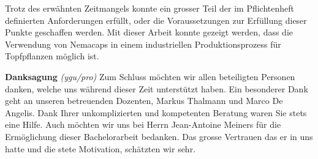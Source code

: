 Trotz des erwähnten Zeitmangels konnte ein grosser Teil der im Pflichtenheft definierten Anforderungen erfüllt, oder die Voraussetzungen zur Erfüllung dieser Punkte geschaffen werden. Mit dieser Arbeit konnte gezeigt werden, dass die Verwendung von Nemacaps in einem industriellen Produktionsprozess für Topfpflanzen möglich ist.
\newline

\textbf{Danksagung}
\newline
\textit{(ygu/pro)} Zum Schluss möchten wir allen beteiligten Personen danken, welche uns während dieser Zeit unterstützt haben. Ein besonderer Dank geht an unseren betreuenden Dozenten, Markus Thalmann und Marco De Angelis. Dank Ihrer unkomplizierten und kompetenten Beratung waren Sie stets eine Hilfe. Auch möchten wir uns bei Herrn Jean-Antoine Meiners für die Ermöglichung dieser Bachelorarbeit bedanken. Das grosse Vertrauen das er in uns hatte und die stete Motivation, schätzten wir sehr.

